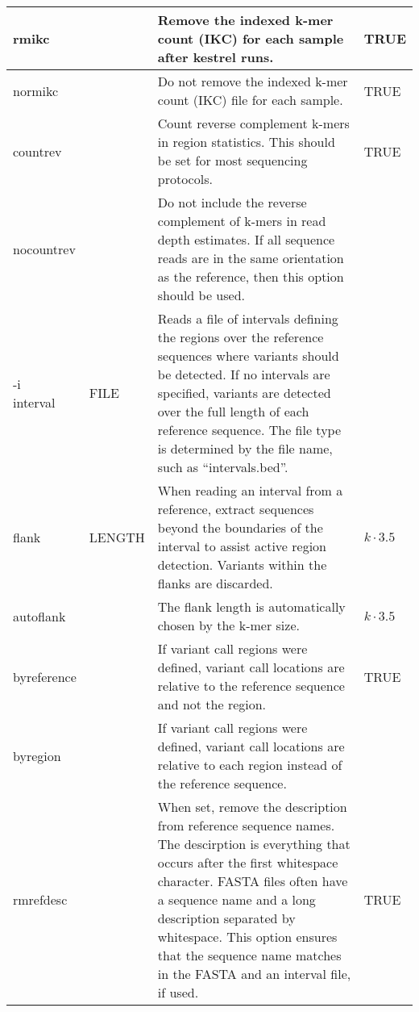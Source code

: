 \begin{small}
\begin{longtable}{|p{\optwidth}|p{\argwidth}|p{\dscwidth}|p{}|}
		\ddash{}rmikc & &
		Remove the indexed k-mer count (IKC) for each sample after kestrel runs.
		& TRUE
		\\ \hline
		
		\ddash{}normikc & &
		Do not remove the indexed k-mer count (IKC) file for each sample.
		& TRUE
		\\ \hline
		
		\ddash{}countrev & &
		Count reverse complement k-mers in region statistics. This should be set for most sequencing protocols.
		& TRUE
		\\ \hline
		
		\ddash{}nocountrev & &
		Do not include the reverse complement of k-mers in read depth estimates. If all sequence reads are in the same orientation as the reference, then this option should be used.
		&
		\\ \hline
		
		\optbox{-i\\\ddash{}interval} & FILE &
		Reads a file of intervals defining the regions over the reference sequences where variants should be detected. If no intervals are specified, variants are detected over the full length of each reference sequence. The file type is determined by the file name, such as ``intervals.bed''.
		&
		\\ \hline
		
		\ddash{}flank & LENGTH &
		When reading an interval from a reference, extract sequences beyond the boundaries of the interval to assist active region detection. Variants within the flanks are discarded.
		&
		$k \cdot 3.5$
		\\ \hline
		
		\ddash{}autoflank & &
		The flank length is automatically chosen by the k-mer size.
		& $k \cdot 3.5$
		\\ \hline
		
		\ddash{}byreference & &
		If variant call regions were defined, variant call locations are relative to the reference sequence and not the region.
		& TRUE
		\\ \hline
		
		\ddash{}byregion & &
		If variant call regions were defined, variant call locations are relative to each region instead of the reference sequence.
		&
		\\ \hline
		
		\ddash{}rmrefdesc & &
		When set, remove the description from reference sequence names. The descirption is everything that occurs after the first whitespace character. FASTA files often have a sequence name and a long description separated by whitespace. This option ensures that the sequence name matches in the FASTA and an interval file, if used.
		& TRUE
		\\ \hline
		

\end{longtable}
\end{small}
